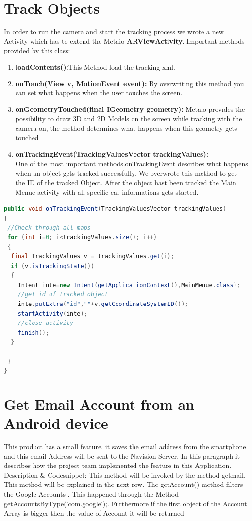 \section{Track Objects}
In order to run the camera and start the tracking process we wrote a new Activity which has to extend the Metaio \textbf{ARViewActivity}. Important methods provided by this class:
\begin{enumerate}
\item \textbf{loadContents():}This Method load the tracking xml.
\item \textbf{onTouch(View v, MotionEvent event):} By overwriting this method you can set what happens when the user touches the screen. 

\item \textbf{onGeometryTouched(final IGeometry geometry):} Metaio provides the possibility to draw 3D and 2D Models on the screen while tracking with the camera on, the method determines what happens when this geometry gets touched 

\item \textbf{onTrackingEvent(TrackingValuesVector trackingValues):} 
\\
One of the most important methods.onTrackingEvent describes what happens when an object gets tracked successfully. We overwrote this method to get the ID of the tracked Object. After the object hast been tracked the Main Menue activity with all specific car informations gets started.   
\end{enumerate} 
\begin{lstlisting}[language=java, caption= where the magic happens]
public void onTrackingEvent(TrackingValuesVector trackingValues)
{
 //Check through all maps 
 for (int i=0; i<trackingValues.size(); i++)
 {
  final TrackingValues v = trackingValues.get(i);
  if (v.isTrackingState())
  {
	Intent inte=new Intent(getApplicationContext(),MainMenue.class);
	//get id of tracked object
	inte.putExtra("id",""+v.getCoordinateSystemID());
	startActivity(inte);
	//close activity
	finish();
  }
				
 }
}
\end{lstlisting}
\section{Get Email Account from an Android device}
This product has  a small feature, it saves the email address from the smartphone and this email Address will be sent to the Navision Server. In this paragraph it describes how the project team implemented the feature in this Application.
Description \& Codesnippet:
This method will be invoked by the method getmail. This method will be explained in the next row. The getAccount() method  filters the Google Accounts . This happened through the Method getAccountsByType('com.google');.
Furthermore if the first object of the Account Array is bigger then the value of Account  it will be returned.

